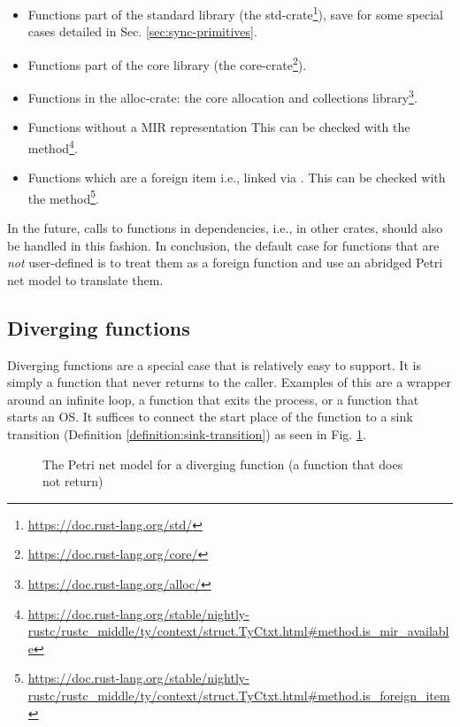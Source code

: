 \begin{itemize}
    \item Functions part of the standard library (the std-crate\footnote{\url{https://doc.rust-lang.org/std/}}),
          save for some special cases detailed in Sec. \ref{sec:sync-primitives}.
    \item Functions part of the core library (the core-crate\footnote{\url{https://doc.rust-lang.org/core/}}).
    \item Functions in the alloc-crate: the core allocation and collections library\footnote{\url{https://doc.rust-lang.org/alloc/}}.
    \item Functions without a \acrshort{MIR} representation
          This can be checked with the 
          method\footnote{\url{https://doc.rust-lang.org/stable/nightly-rustc/rustc_middle/ty/context/struct.TyCtxt.html\#method.is\_mir\_available}}.
    \item Functions which are a foreign item i.e., linked via .
          This can be checked with the 
          method\footnote{\url{https://doc.rust-lang.org/stable/nightly-rustc/rustc_middle/ty/context/struct.TyCtxt.html\#method.is\_foreign\_item}}.
\end{itemize}

In the future, calls to functions in dependencies, i.e., in other crates, should also be handled in this fashion.
In conclusion, the default case for functions that are \emph{not} user-defined
is to treat them as a foreign function and use an abridged Petri net model to translate them.

\subsection{Diverging functions}

Diverging functions are a special case that is relatively easy to support.
It is simply a function that never returns to the caller.
Examples of this are a wrapper around an infinite  loop,
a function that exits the process,
or a function that starts an \acrshort{OS}.
It suffices to connect the start place of the function to
a sink transition (Definition \ref{definition:sink-transition})
as seen in Fig. \ref{fig:diverging-function}.

\begin{figure}[!htb]
    \centering
    
    \caption{The Petri net model for a diverging function (a function that does not return)}
    \label{fig:diverging-function}
\end{figure}


